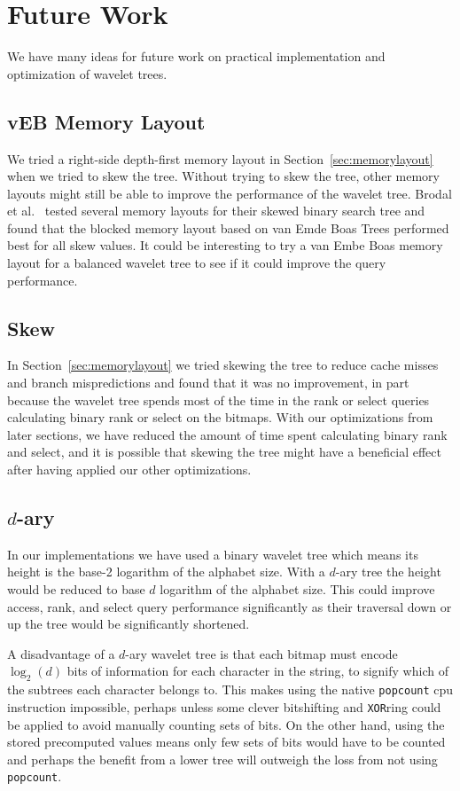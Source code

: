 \section{Future Work}
We have many ideas for future work on practical implementation and optimization of wavelet trees.

\subsection{vEB Memory Layout}
\label{sec:futurework_vebmemorylayout}
We tried a right-side depth-first memory layout in Section~\ref{sec:memorylayout} when we tried to skew the tree.
Without trying to skew the tree, other memory layouts might still be able to improve the performance of the wavelet tree.
Brodal et al.~ tested several memory layouts for their skewed binary search tree and found that the blocked memory layout based on van Emde Boas Trees performed best for all skew values.
It could be interesting to try a van Embe Boas memory layout for a balanced wavelet tree to see if it could improve the query performance.

\subsection{Skew}
In Section~\ref{sec:memorylayout} we tried skewing the tree to reduce cache misses and branch mispredictions and found that it was no improvement, in part because the wavelet tree spends most of the time in the rank or select queries calculating binary rank or select on the bitmaps.
With our optimizations from later sections, we have reduced the amount of time spent calculating binary rank and select, and it is possible that skewing the tree might have a beneficial effect after having applied our other optimizations.

\subsection{$d$-ary}
In our implementations we have used a binary wavelet tree which means its height is the base-2 logarithm of the alphabet size.
With a $d$-ary tree the height would be reduced to base $d$ logarithm of the alphabet size.
This could improve access, rank, and select query performance significantly as their traversal down or up the tree would be significantly shortened.

A disadvantage of a $d$-ary wavelet tree is that each bitmap must encode $\log_2(d)$ bits of information for each character in the string, to signify which of the subtrees each character belongs to.
This makes using the native \texttt{popcount} cpu instruction impossible, perhaps unless some clever bitshifting and \texttt{XOR}ring could be applied to avoid manually counting sets of bits.
On the other hand, using the stored precomputed values means only few sets of bits would have to be counted and perhaps the benefit from a lower tree will outweigh the loss from not using \texttt{popcount}.

